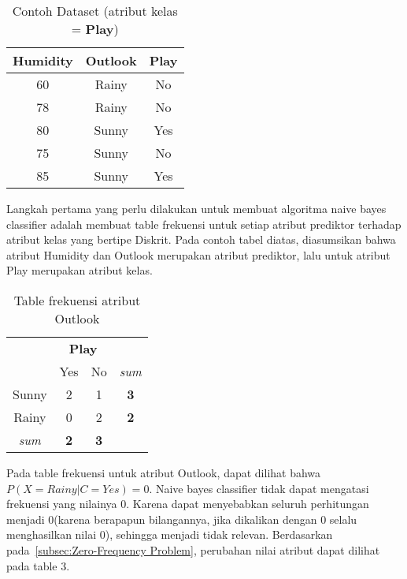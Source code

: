 		\begin{table}[H]
		\label{tab:dataset}
		\centering
		\caption{Contoh Dataset (atribut kelas = \textbf{Play})}
		\begin{tabular}{ | c | c | c | }
		\hline
		 Humidity & Outlook & \textbf{Play}\\ \hline \hline
		60 & Rainy & No\\ \hline
		78 & Rainy & No\\ \hline
		80 & Sunny & Yes\\ \hline
		75 & Sunny & No\\ \hline
		85 & Sunny & Yes \\ \hline
		\end{tabular}
		\end{table}
		
		
		Langkah pertama yang perlu dilakukan untuk membuat algoritma naive bayes classifier adalah membuat table frekuensi untuk setiap atribut prediktor terhadap atribut kelas yang bertipe Diskrit. Pada contoh tabel diatas, diasumsikan bahwa atribut Humidity dan Outlook merupakan atribut prediktor, lalu untuk atribut Play merupakan atribut kelas.
		
		\begin{table}[ht]
			\centering
			\caption{Table frekuensi atribut Outlook}
			\begin{tabular}{ | c | c | c | c | }
			\hline
			 & \multicolumn{2}{c}{\textbf{Play}} & \\ 
			 & Yes & No & \textit{sum} \\
			\hline
			Sunny & 2 & 1 & \textbf{3}\\
			\hline
			Rainy & 0 & 2 & \textbf{2} \\
			\hline
			\textit{sum} & \textbf{2} & \textbf{3} & \\
			\hline
			\end{tabular}
		\end{table}
		
		Pada table frekuensi untuk atribut Outlook, dapat dilihat bahwa $P(X=Rainy|C=Yes) = 0$. Naive bayes classifier tidak dapat mengatasi frekuensi yang nilainya 0. Karena dapat menyebabkan seluruh perhitungan menjadi 0(karena berapapun bilangannya, jika dikalikan dengan 0 selalu menghasilkan nilai 0), sehingga menjadi tidak relevan. Berdasarkan pada~\ref{subsec:Zero-Frequency Problem}, perubahan nilai atribut dapat dilihat pada table 3. \\ 

